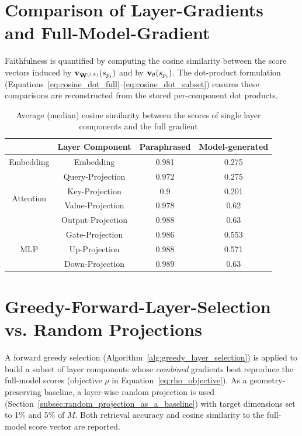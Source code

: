 
\section{Comparison of Layer-Gradients and Full-Model-Gradient}\label{sec:layer_vs_full}
Faithfulness is quantified by computing the cosine similarity between the score vectors induced by $\vXspi[\W^{(l,k)}]$ and by $\vXspi[\theta]$. The dot-product formulation (Equations~\ref{eq:cosine_dot_full}–\ref{eq:cosine_dot_subset}) ensures these comparisons are reconstructed from the stored per-component dot products.
\begin{table}[h]
    \centering
    \begin{tabular}{|c|c|c|c|}
        \hline
        & \textbf{Layer Component} & \textbf{Paraphrased} & \textbf{Model-generated} \\
        \hline
        \multirow{1}{5em}{Embedding}
        & Embedding & 0.981 & 0.275 \\
        \hline
        \multirow{4}{5em}{Attention}
        & Query-Projection & 0.972 & 0.275 \\
        & Key-Projection & 0.9 & 0.201 \\
        & Value-Projection & 0.978 & 0.62 \\
        & Output-Projection & 0.988 & 0.63 \\
        \hline
        \multirow{3}{5em}{MLP}
        & Gate-Projection & 0.986 & 0.553 \\
        & Up-Projection & 0.988 & 0.571 \\
        & Down-Projection & 0.989 & 0.63 \\
        \hline
    \end{tabular}
    \caption{Average (median) cosine similarity between the scores of single layer components and the full gradient}
    \label{tab:average_cosine_similarity_full_gradient_comparison}
\end{table}


\section{Greedy-Forward-Layer-Selection vs. Random Projections}\label{sec:greedy_vs_rp}
A forward greedy selection (Algorithm~\ref{alg:greedy_layer_selection}) is applied to build a subset of layer components whose \emph{combined} gradients best reproduce the full-model scores (objective $\rho$ in Equation~\ref{eq:rho_objective}). As a geometry-preserving baseline, a layer-wise random projection is used (Section~\ref{subsec:random_projection_as_a_baseline}) with target dimensions set to 1\% and 5\% of $M$. Both retrieval accuracy and cosine similarity to the full-model score vector are reported.

